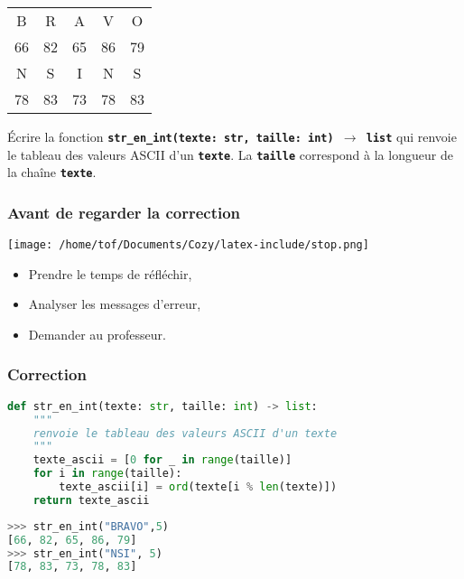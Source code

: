 \documentclass[svgnames,11pt]{beamer}
\begin{document}
\begin{frame}
    \frametitle{}
    \begin{center}
        \begin{tabular}{*{5}{c}}
            B&R&A&V&O\\
            66&82&65&86&79\\
            N&S&I&N&S\\
            78&83&73&78&83\\
        \end{tabular}
    \end{center}
    \begin{activite}
    Écrire la fonction \textbf{\texttt{str\_en\_int(texte: str, taille: int) $\rightarrow$ list}} qui renvoie le tableau des valeurs ASCII d'un \textbf{\texttt{texte}}. La \textbf{\texttt{taille}} correspond à la longueur de la chaîne \textbf{\texttt{texte}}.
    \end{activite}

\end{frame}
\begin{frame}
    \frametitle{Avant de regarder la correction}
\begin{center}
    \centering
    \texttt{[image: /home/tof/Documents/Cozy/latex-include/stop.png]}
    \end{center}
{\Large
    \begin{itemize}
        \item Prendre le temps de réfléchir,
        \item Analyser les messages d'erreur,
        \item Demander au professeur.
    \end{itemize}
}
\end{frame}
\begin{frame}[fragile]
    \frametitle{Correction}

\begin{center}
\begin{lstlisting}[language=Python , basicstyle=\ttfamily\small, xleftmargin=0.2em, xrightmargin=0em]
def str_en_int(texte: str, taille: int) -> list:
    """
    renvoie le tableau des valeurs ASCII d'un texte
    """
    texte_ascii = [0 for _ in range(taille)]
    for i in range(taille):
        texte_ascii[i] = ord(texte[i % len(texte)])
    return texte_ascii
\end{lstlisting}
\begin{lstlisting}[language=Python , basicstyle=\ttfamily\small, xleftmargin=0.2em, xrightmargin=0em]
>>> str_en_int("BRAVO",5)
[66, 82, 65, 86, 79]
>>> str_en_int("NSI", 5)
[78, 83, 73, 78, 83]
\end{lstlisting}
\end{center}

\end{frame}
\end{document}
